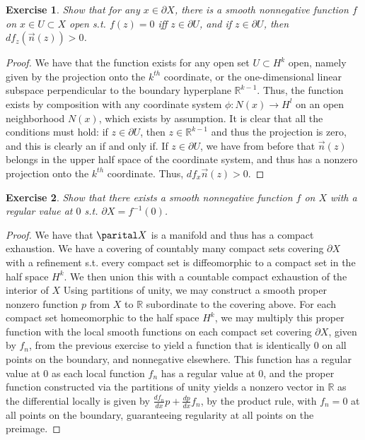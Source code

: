 \documentclass{article}
\newtheorem{exercise}{Exercise}
\begin{document}
  \begin{exercise}
    Show that for any $x \in \partial X$, there is a smooth nonnegative function $f$ on $x \in U \subset X$ open s.t. $f(z) = 0$ iff $z \in \partial U$, and if $z \in \partial U$, then $df_{z}(\vec{n}(z)) > 0$.
  \end{exercise}
  \begin{proof}
    We have that the function exists for any open set $U \subset H^{k}$ open, namely given by the projection onto the $k^{th}$ coordinate, or the one-dimensional linear subspace perpendicular to the boundary hyperplane $\mathbb{R}^{k-1}$. Thus, the function exists by composition with any coordinate system $\phi: N(x) \to H^{l}$ on an open neighborhood $N(x)$, which exists by assumption. It is clear that all the conditions must hold: if $z \in \partial U$, then $z \in \mathbb{R}^{k-1}$ and thus the projection is zero, and this is clearly an if and only if. If $z \in \partial U$, we have from before that $\vec{n}(z)$ belongs in the upper half space of the coordinate system, and thus has a nonzero projection onto the $k^{th}$ coordinate. Thus, $df_{x}\vec{n}(z) > 0$. 
  \end{proof}

  \begin{exercise}
    Show that there exists a smooth nonnegative function $f$ on $X$ with a regular value at $0$ s.t. $\partial X = f^{-1}(0)$.
\end{exercise}

\begin{proof}
We have that $\parital X$ is a manifold and thus has a compact exhaustion. We have a covering of countably many compact sets covering $\partial X$ with a refinement s.t. every compact set is diffeomorphic to a compact set in the half space $H^{k}$. We then union this with a countable compact exhaustion of the interior of $X$ Using partitions of unity, we may construct a smooth proper nonzero function $p$ from $X$ to $\mathbb{R}$ subordinate to the covering above. For each compact set homeomorphic to the half space $H^{k}$, we may multiply this proper function with the local smooth functions on each compact set covering $\partial X$, given by $f_{n}$, from the previous exercise to yield a function that is identically $0$ on all points on the boundary, and nonnegative elsewhere. This function has a regular value at $0$ as each local function $f_{n}$ has a regular value at $0$, and the proper function constructed via the partitions of unity yields a nonzero vector in $\mathbb{R}$ as the differential locally is given by $\frac{df_{n}}{dx}p + \frac{dp}{dx}f_{n}$, by the product rule, with $f_{n} = 0$ at all points on the boundary, guaranteeing regularity at all points on the preimage. 
\end{proof}
\end{document}
